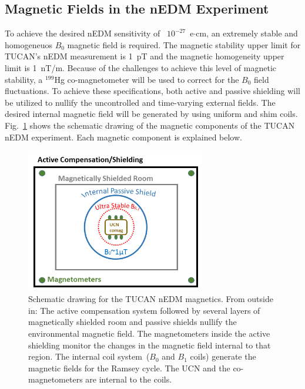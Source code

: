 




\subsection{Magnetic Fields in the nEDM Experiment}
To achieve the desired nEDM sensitivity of ~$10^{-27}$~e$\cdot$cm, an
extremely stable and homogeneuos $B_0$ magnetic field is required.
The magnetic stability upper limit for TUCAN's nEDM measurement is
1~pT and the magnetic homogeneity upper limit is 1~nT/m.
Because of the challenges to achieve this level of magnetic stability,
a $^{199}$Hg co-magnetometer will be used to correct for the $B_0$
field fluctuations. To achieve these specifications, both active and
passive shielding will be utilized to nullify the uncontrolled and
time-varying external fields. The desired internal magnetic field will
be generated by using uniform and shim
coils. Fig.~\ref{fig:magneticscheme} shows the schematic drawing of
the magnetic components of the TUCAN nEDM experiment. Each magnetic
component is explained below.

\begin{figure}[h!]
  \centering
  \includegraphics[width=0.7\textwidth]{magneticscheme.png}
  \caption{Schematic drawing for the TUCAN nEDM magnetics. From
    outside in: The active compensation system followed by several
    layers of magnetically shielded room and passive shields nullify
    the environmental magnetic field. The magnetometers inside the
    active shielding monitor the changes in the magnetic field
    internal to that region. The internal coil system~($B_0$ and $B_1$
    coils) generate the magnetic fields for the Ramsey cycle. The UCN
    and the co-magnetometers are internal to the coils.  }
  \label{fig:magneticscheme}
\end{figure}



